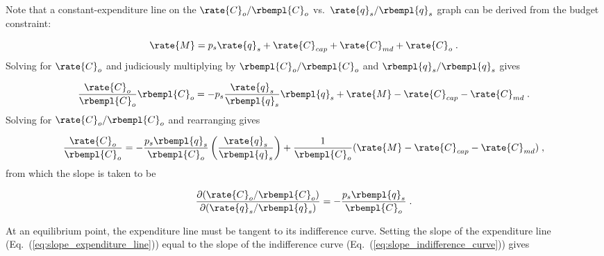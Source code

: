 Note that a constant-expenditure line on the 
$\rate{C}_o/\rbempl{C}_o$ vs.\ $\rate{q}_s/\rbempl{q}_s$ graph
can be derived from the budget constraint:

\begin{equation}
  \rate{M} = p_s \rate{q}_s + \rate{C}_{cap} + \rate{C}_{md} + \rate{C}_o \; . 
\end{equation}
%
Solving for $\rate{C}_o$ and judiciously multiplying by $\rbempl{C}_o/\rbempl{C}_o$
and $\rbempl{q}_s/\rbempl{q}_s$ gives

\begin{equation}
  \frac{\rate{C}_o}{\rbempl{C}_o} \rbempl{C}_o = - p_s \frac{\rate{q}_s}{\rbempl{q}_s} \rbempl{q}_s
                        + \rate{M} - \rate{C}_{cap} - \rate{C}_{md} \; .
\end{equation}
%
Solving for $\rate{C}_o/\rbempl{C}_o$ and rearranging gives

\begin{equation}
  \frac{\rate{C}_o}{\rbempl{C}_o} = - \frac{p_s \rbempl{q}_s}{\rbempl{C}_o}  
                                        \left( \frac{\rate{q}_s}{\rbempl{q}_s}   \right)
                                    + \frac{1}{\rbempl{C}_o}
                                          (\rate{M} - \rate{C}_{cap} - \rate{C}_{md}) \; ,
\end{equation}
%
from which the slope is taken to be

\begin{equation} \label{eq:slope_expenditure_line}
  \frac{\partial (\rate{C}_o/\rbempl{C}_o)}{\partial (\rate{q}_s/\rbempl{q}_s)} =
              - \frac{p_s \rbempl{q}_s}{\rbempl{C}_o} \; .
\end{equation}

At an equilibrium point, the expenditure line must be tangent to its indifference curve.
Setting the slope of the expenditure line (Eq.~(\ref{eq:slope_expenditure_line}))
equal to the slope of the indifference curve (Eq.~(\ref{eq:slope_indifference_curve})) gives





